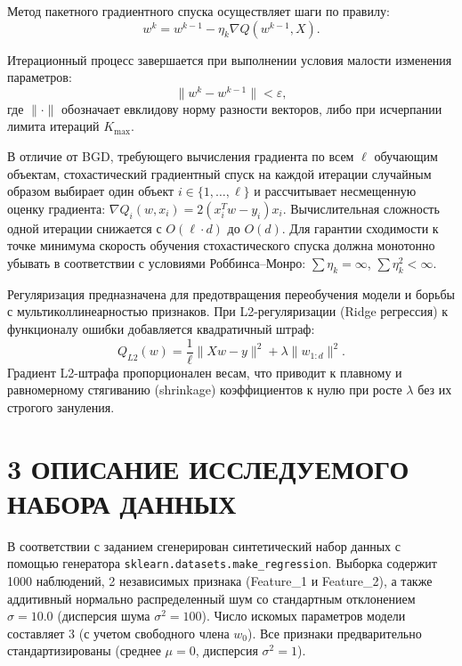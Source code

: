 \documentclass[14pt,a4paper]{extarticle}
\begin{document}
Метод пакетного градиентного спуска осуществляет шаги по правилу:
\begin{equation}
w^k = w^{k-1} - \eta_k \nabla Q(w^{k-1}, X).
\end{equation}

Итерационный процесс завершается при выполнении условия малости изменения параметров:
\begin{equation}
\|w^k - w^{k-1}\| < \varepsilon,
\end{equation}
где $\|\cdot\|$ обозначает евклидову норму разности векторов, либо при исчерпании лимита итераций $K_{\max}$.

В отличие от BGD, требующего вычисления градиента по всем $\ell$ обучающим объектам, стохастический градиентный спуск на каждой итерации случайным образом выбирает один объект $i \in \{1, \dots, \ell\}$ и рассчитывает несмещенную оценку градиента: $\nabla Q_i(w, x_i) = 2 (x_i^T w - y_i) x_i$. Вычислительная сложность одной итерации снижается с $O(\ell \cdot d)$ до $O(d)$. Для гарантии сходимости к точке минимума скорость обучения стохастического спуска должна монотонно убывать в соответствии с условиями Роббинса--Монро: $\sum \eta_k = \infty$, $\sum \eta_k^2 < \infty$.

Регуляризация предназначена для предотвращения переобучения модели и борьбы с мультиколлинеарностью признаков. При L2-регуляризации (Ridge регрессия) к функционалу ошибки добавляется квадратичный штраф:
\begin{equation}
Q_{L2}(w) = \frac{1}{\ell} \|X w - y\|^2 + \lambda \|w_{1:d}\|^2.
\end{equation}
Градиент L2-штрафа пропорционален весам, что приводит к плавному и равномерному стягиванию (shrinkage) коэффициентов к нулю при росте $\lambda$ без их строгого зануления.

\section*{3 ОПИСАНИЕ ИССЛЕДУЕМОГО НАБОРА ДАННЫХ}

В соответствии с заданием сгенерирован синтетический набор данных с помощью генератора \texttt{sklearn.datasets.make\_regression}. Выборка содержит 1000 наблюдений, 2 независимых признака (Feature\_1 и Feature\_2), а также аддитивный нормально распределенный шум со стандартным отклонением $\sigma = 10.0$ (дисперсия шума $\sigma^2 = 100$). Число искомых параметров модели составляет 3 (с учетом свободного члена $w_0$). Все признаки предварительно стандартизированы (среднее $\mu = 0$, дисперсия $\sigma^2 = 1$).
\end{document}
